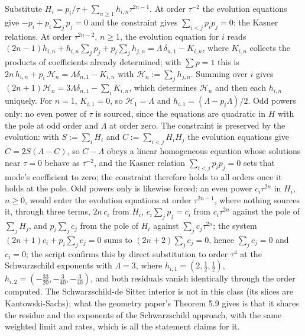Substitute $H_i = p_i/\tau + \sum_{n\geq 1}h_{i,n}\tau^{2n-1}$. At order $\tau^{-2}$ the evolution equations give $-p_i + p_i\sum_j p_j = 0$ and the constraint gives $\sum_{i<j}p_ip_j = 0$: the Kasner relations. At order $\tau^{2n-2}$, $n \geq 1$, the evolution equation for $i$ reads $(2n-1)h_{i,n} + h_{i,n}\sum_j p_j + p_i\sum_j h_{j,n} = \Lambda\,\delta_{n,1} - K_{i,n}$, where $K_{i,n}$ collects the products of coefficients already determined; with $\sum p = 1$ this is $2n\,h_{i,n} + p_i\,\mathcal{H}_n = \Lambda\delta_{n,1} - K_{i,n}$ with $\mathcal{H}_n := \sum_j h_{j,n}$. Summing over $i$ gives $(2n+1)\mathcal{H}_n = 3\Lambda\delta_{n,1} - \sum_iK_{i,n}$, which determines $\mathcal{H}_n$ and then each $h_{i,n}$ uniquely. For $n = 1$, $K_{i,1} = 0$, so $\mathcal{H}_1 = \Lambda$ and $h_{i,1} = (\Lambda - p_i\Lambda)/2$. Odd powers only: no even power of $\tau$ is sourced, since the equations are quadratic in $H$ with the pole at odd order and $\Lambda$ at order zero. The constraint is preserved by the evolution: with $S := \sum_iH_i$ and $C := \sum_{i<j}H_iH_j$ the evolution equations give $\dot C = 2S(\Lambda - C)$, so $C - \Lambda$ obeys a linear homogeneous equation whose solutions near $\tau = 0$ behave as $\tau^{-2}$, and the Kasner relation $\sum_{i<j}p_ip_j = 0$ sets that mode's coefficient to zero; the constraint therefore holds to all orders once it holds at the pole. Odd powers only is likewise forced: an even power $c_i\tau^{2n}$ in $H_i$, $n \geq 0$, would enter the evolution equations at order $\tau^{2n-1}$, where nothing sources it, through three terms, $2n\,c_i$ from $\dot H_i$, $c_i\sum_jp_j = c_i$ from $c_i\tau^{2n}$ against the pole of $\sum_jH_j$, and $p_i\sum_jc_j$ from the pole of $H_i$ against $\sum_jc_j\tau^{2n}$; the system $(2n+1)c_i + p_i\sum_jc_j = 0$ sums to $(2n+2)\sum_jc_j = 0$, hence $\sum_jc_j = 0$ and $c_i = 0$; the script confirms this by direct substitution to order $\tau^4$ at the Schwarzschild exponents with $\Lambda = 3$, where $h_{i,1} = (2, \tfrac12, \tfrac12)$, $h_{i,2} = (-\tfrac{33}{20}, -\tfrac{3}{40}, -\tfrac{3}{40})$, and both residuals vanish identically through the order computed. The Schwarzschild-de Sitter interior is not in this class (its slices are Kantowski-Sachs); what the geometry paper's Theorem 5.9 \cite[Thm.~5.9]{ButlerT6} gives is that it shares the residue and the exponents of the Schwarzschild approach, with the same weighted limit and rates, which is all the statement claims for it.
